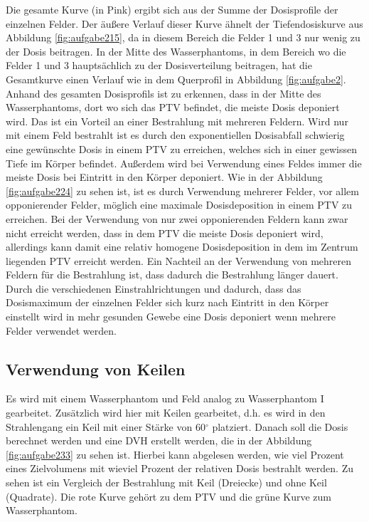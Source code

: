 Die gesamte Kurve (in Pink) ergibt sich aus der Summe der Dosisprofile der einzelnen
Felder. Der äußere Verlauf dieser Kurve ähnelt der Tiefendosiskurve aus Abbildung
\ref{fig:aufgabe215}, da in diesem Bereich die Felder 1 und 3 nur wenig zu
der Dosis beitragen. In der Mitte des Wasserphantoms, in dem Bereich wo die
Felder 1 und 3 hauptsächlich zu der Dosisverteilung beitragen, hat die Gesamtkurve
einen Verlauf wie in dem Querprofil in Abbildung \ref{fig:aufgabe2}. \\
Anhand des gesamten Dosisprofils ist zu erkennen, dass in der Mitte des Wasserphantoms,
dort wo sich das PTV befindet, die meiste Dosis deponiert wird.
Das ist ein Vorteil an einer Bestrahlung mit mehreren Feldern. Wird nur mit einem
Feld bestrahlt ist es durch den exponentiellen Dosisabfall schwierig eine gewünschte
Dosis in einem PTV zu erreichen, welches sich in einer gewissen Tiefe im Körper
befindet. Außerdem wird bei Verwendung eines Feldes immer die meiste Dosis bei
Eintritt in den Körper deponiert. Wie in der Abbildung \ref{fig:aufgabe224} zu sehen
ist, ist es durch Verwendung mehrerer Felder, vor allem opponierender Felder, möglich
eine maximale Dosisdeposition in einem PTV zu erreichen.
Bei der Verwendung von nur zwei opponierenden Feldern kann zwar nicht erreicht werden,
dass in dem PTV die meiste Dosis deponiert wird, allerdings kann damit eine relativ
homogene Dosisdeposition in dem im Zentrum liegenden PTV erreicht werden.
Ein Nachteil an der Verwendung von mehreren Feldern für die
Bestrahlung ist, dass dadurch die Bestrahlung länger dauert. Durch
die verschiedenen Einstrahlrichtungen und dadurch, dass das Dosismaximum der
einzelnen Felder sich kurz nach Eintritt in den Körper einstellt wird in mehr
gesunden Gewebe eine Dosis deponiert wenn mehrere Felder verwendet werden.


\subsection{Verwendung von Keilen}
\label{subsec:Keilen}

Es wird mit einem Wasserphantom und Feld analog zu Wasserphantom I gearbeitet. Zusätzlich wird hier mit Keilen gearbeitet, d.h. es wird in den Strahlengang ein Keil mit einer Stärke von 60$^\circ$ platziert. Danach soll die Dosis berechnet werden und eine DVH erstellt werden, die in der Abbildung \ref{fig:aufgabe233} zu sehen ist. Hierbei kann abgelesen werden, wie viel Prozent eines Zielvolumens mit wieviel Prozent der relativen Dosis bestrahlt werden. Zu sehen ist ein Vergleich der Bestrahlung mit Keil (Dreiecke) und ohne Keil (Quadrate). Die rote Kurve gehört zu dem PTV und die grüne Kurve zum Wasserphantom.



